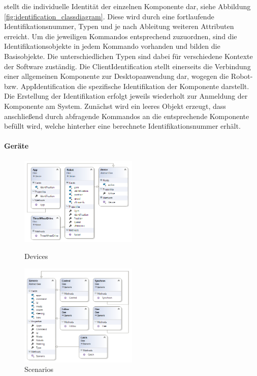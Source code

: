 stellt die individuelle Identität der einzelnen Komponente dar, siehe Abbildung \eqref{fig:identification_classdiagram}. Diese wird durch eine fortlaufende Identifikationsnummer, Typen und je nach Ableitung weiteren Attributen erreicht. Um die jeweiligen Kommandos entsprechend zuzuordnen, sind die Identifikationsobjekte in jedem Kommando vorhanden und bilden die Basisobjekte. Die unterschiedlichen Typen sind dabei für verschiedene Kontexte der Software zuständig. Die ClientIdentification stellt einerseits die Verbindung einer allgemeinen Komponente zur Desktopanwendung dar, wogegen die Robot- bzw. AppIdentification die spezifische Identifikation der Komponente darstellt. Die Erstellung der Identifikation erfolgt jeweils wiederholt zur Anmeldung der Komponente am System. Zunächst wird ein leeres Objekt erzeugt, dass anschließend durch abfragende Kommandos an die entsprechende Komponente befüllt wird, welche hinterher eine berechnete Identifikationsnummer erhält.

\newpage
\paragraph{Geräte}

\begin{figure}
	\begin{center}
		\includegraphics[width=0.5\textwidth]{images/uml/devices.png}
	\end{center}
	\caption{Devices}
	\label{fig:devices_classdiagram}
	\begin{center}
		\includegraphics[width=0.5\textwidth]{images/uml/szenarios.png}
	\end{center}
	\caption{Scenarios}
	\label{fig:szenarios_classdiagram}
\end{figure}

